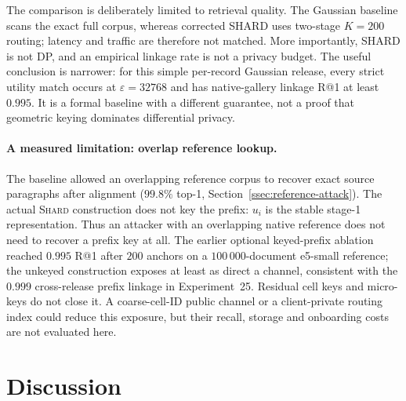 \documentclass[11pt,a4paper]{article}
\begin{document}
The comparison is deliberately limited to retrieval quality. The Gaussian
baseline scans the exact full corpus, whereas corrected SHARD uses two-stage
$K=200$ routing; latency and traffic are therefore not matched. More
importantly, SHARD is not DP, and an empirical linkage rate is not a privacy
budget. The useful conclusion is narrower: for this simple per-record
Gaussian release, every strict utility match occurs at
$\varepsilon=32768$ and has native-gallery linkage R@1 at least $0.995$. It is
a formal baseline with a different guarantee, not a proof that geometric
keying dominates differential privacy.

\paragraph{A measured limitation: overlap reference lookup.}\label{ssec:shard-ref}

The baseline allowed an overlapping reference corpus to recover exact
source paragraphs after alignment ($99.8\%$ top-1,
Section~\ref{ssec:reference-attack}). The actual \textsc{Shard} construction
does not key the prefix: $u_i$ is the stable stage-1 representation. Thus an
attacker with an overlapping native reference does not need to recover a
prefix key at all. The earlier optional keyed-prefix ablation reached
$0.995$ R@1 after $200$ anchors on a $100\,000$-document e5-small reference;
the unkeyed construction exposes at least as direct a channel, consistent
with the $0.999$ cross-release prefix linkage in Experiment~25. Residual
cell keys and micro-keys do not close it. A coarse-cell-ID public channel or
a client-private routing index could reduce this exposure, but their recall,
storage and onboarding costs are not evaluated here.

\FloatBarrier
\section{Discussion}\label{sec:discussion}
\end{document}
